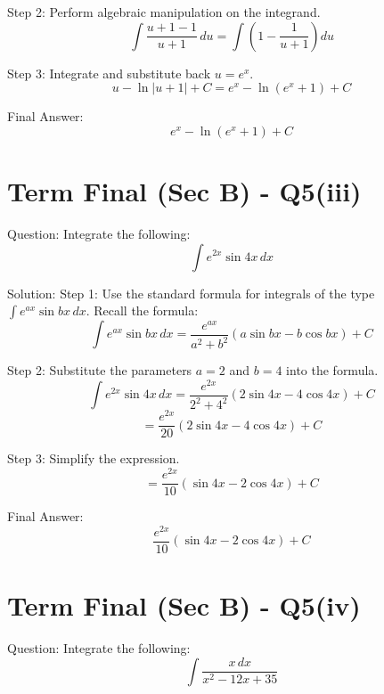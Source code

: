 \documentclass{article}
\begin{document}
Step 2: Perform algebraic manipulation on the integrand.
\[
\int \frac{u+1-1}{u+1} \, du = \int \left( 1 - \frac{1}{u+1} \right) du
\]

Step 3: Integrate and substitute back \(u = e^x\).
\[
u - \ln|u+1| + C = e^x - \ln(e^x+1) + C
\]

Final Answer:
\[
\boxed{e^x - \ln(e^x+1) + C}
\]

\section*{Term Final (Sec B) - Q5(iii)}
Question:
Integrate the following:
\[
\int e^{2x} \sin 4x \, dx
\]

Solution:
Step 1: Use the standard formula for integrals of the type \(\int e^{ax} \sin bx \, dx\).
Recall the formula:
\[
\int e^{ax} \sin bx \, dx = \frac{e^{ax}}{a^2+b^2} (a \sin bx - b \cos bx) + C
\]

Step 2: Substitute the parameters \(a=2\) and \(b=4\) into the formula.
\[
\int e^{2x} \sin 4x \, dx = \frac{e^{2x}}{2^2+4^2} (2 \sin 4x - 4 \cos 4x) + C
\]
\[
= \frac{e^{2x}}{20} (2 \sin 4x - 4 \cos 4x) + C
\]

Step 3: Simplify the expression.
\[
= \frac{e^{2x}}{10} (\sin 4x - 2 \cos 4x) + C
\]

Final Answer:
\[
\boxed{\frac{e^{2x}}{10} (\sin 4x - 2 \cos 4x) + C}
\]

\section*{Term Final (Sec B) - Q5(iv)}
Question:
Integrate the following:
\[
\int \frac{x \, dx}{x^2-12x+35}
\]
\end{document}
